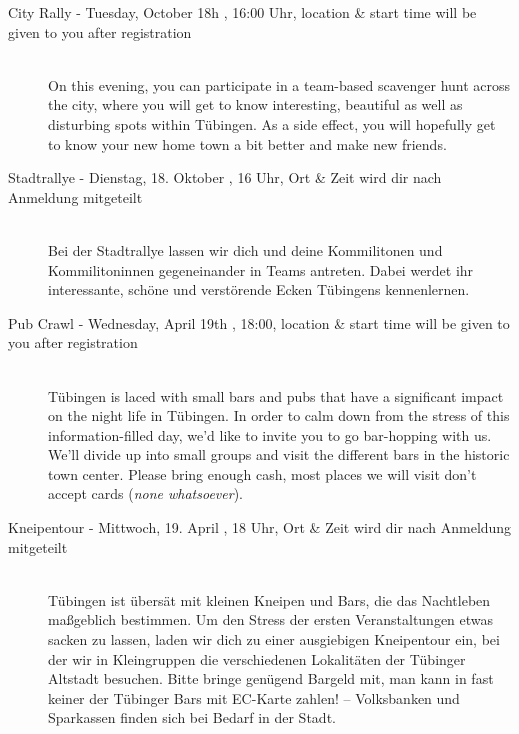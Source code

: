 \begin{description}
\ifml
	\item[City Rally - Tuesday, October 18h \YEAR, 16:00 Uhr, \footnotesize{location \& start time will be given to you after registration}]~\\
	On this evening, you can participate in a team-based scavenger hunt across the city,
	where you will get to know interesting, beautiful as well as disturbing spots within Tübingen.
	As a side effect, you will hopefully get to know your new home town a bit better and make new friends.
\else
	\item[Stadtrallye - Dienstag, 18. Oktober \YEAR, 16 Uhr, \footnotesize{Ort \& Zeit wird dir nach Anmeldung mitgeteilt}]\ \\
	Bei der Stadtrallye lassen wir dich und deine Kommilitonen und Kommilitoninnen gegeneinander in Teams antreten.
	Dabei werdet ihr interessante, schöne und verstörende Ecken Tübingens kennenlernen.
\fi


\ifml
\item[Pub Crawl - Wednesday, April 19th \YEAR, 18:00, \footnotesize{location \& start time will be given to you after registration}]~\\
Tübingen is laced with small bars and pubs that have a significant impact on the night life in Tübingen.
In order to calm down from the stress of this information-filled day, we'd like to invite you to go bar-hopping with us.
We'll divide up into small groups and visit the different bars in the historic town center.
Please bring enough cash, most places we will visit don't accept cards (\emph{none whatsoever}).

\else
\item[Kneipentour - Mittwoch, 19. April \YEAR, 18 Uhr, \footnotesize{Ort \& Zeit wird dir nach Anmeldung mitgeteilt}]~\\
Tübingen ist übersät mit kleinen Kneipen und Bars, die das Nachtleben maßgeblich bestimmen.
Um den Stress der ersten Veranstaltungen etwas sacken zu lassen, laden wir dich zu einer ausgiebigen Kneipentour ein,
bei der wir in Kleingruppen die verschiedenen Lokalitäten der Tübinger Altstadt besuchen.
Bitte bringe genügend Bargeld mit, man kann in fast keiner der Tübinger Bars mit EC-Karte zahlen! -- Volksbanken und Sparkassen finden sich bei Bedarf in der Stadt.
\fi


\end{description}
